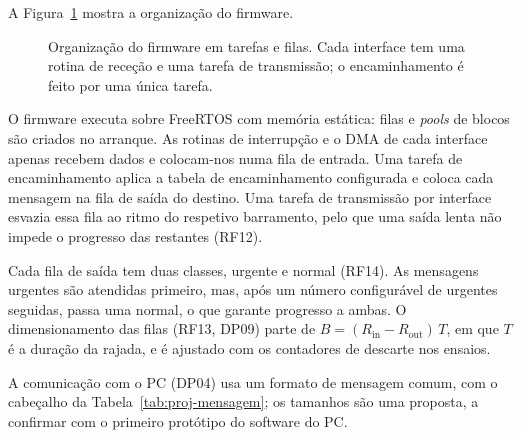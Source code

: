 A Figura~\ref{fig:tarefas} mostra a organização do firmware.

\begin{figure}[htbp]
\centering
{}
\caption[Organização do firmware em tarefas e filas.]{Organização do firmware em tarefas e filas. Cada interface tem uma rotina de receção e uma tarefa de transmissão; o encaminhamento é feito por uma única tarefa.}
\label{fig:tarefas}
\end{figure}

O firmware executa sobre FreeRTOS com memória estática: filas e
\textit{pools} de blocos são criados no arranque. As rotinas de
interrupção e o DMA de cada interface apenas recebem dados e colocam-nos
numa fila de entrada. Uma tarefa de encaminhamento aplica a tabela de
encaminhamento configurada e coloca cada mensagem na fila de saída do
destino. Uma tarefa de transmissão por interface esvazia essa fila ao
ritmo do respetivo barramento, pelo que uma saída lenta não impede o
progresso das restantes (RF12).

Cada fila de saída tem duas classes, urgente e normal (RF14). As
mensagens urgentes são atendidas primeiro, mas, após um número
configurável de urgentes seguidas, passa uma normal, o que garante
progresso a ambas. O dimensionamento das filas (RF13, DP09) parte de
$B = (R_{\mathrm{in}} - R_{\mathrm{out}})\,T$, em que $T$ é a duração da
rajada, e é ajustado com os contadores de descarte nos ensaios.

A comunicação com o PC (DP04) usa um formato de mensagem comum, com o
cabeçalho da Tabela~\ref{tab:proj-mensagem}; os tamanhos são uma
proposta, a confirmar com o primeiro protótipo do software do PC.


